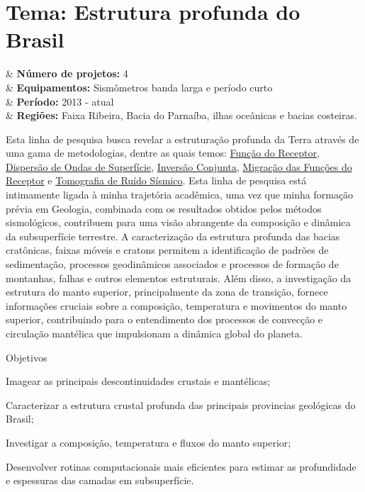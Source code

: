 \documentclass[10pt,a4paper,oneside]{book}
\begin{document}
\section{Tema: Estrutura profunda do Brasil}

\begin{summarybox}[frametitle=\faProjectDiagram{}\quad Panorama da linha de pesquisa]
	\begin{datelist}
		\faFile* & \textbf{Número de projetos:} 4 \\
		\faBinoculars & \textbf{Equipamentos:} Sismômetros banda larga e período curto \\
		\faCalendar*[regular] & \textbf{Período:} 2013 - atual \\
		\faMapMarked* & \textbf{Regiões:} Faixa Ribeira, Bacia do Parnaíba, ilhas oceânicas e bacias costeiras. \\
	\end{datelist}
\end{summarybox}

\bigskip

Esta linha de pesquisa busca revelar a estruturação profunda da Terra através de uma gama de metodologias, dentre as quais temos: \href{https://doi.org/10.1029/JB084iB09p04749}{Função do Receptor}, \href{https://doi.org/10.1111/j.1365-246X.1990.tb04573.x}{Dispersão de Ondas de Superfície}, \href{https://doi.org/10.1046/j.1365-246x.2000.00217.x}{Inversão Conjunta}, \href{https://doi.org/10.1016/j.epsl.2013.08.025}{Migração das Funções do Receptor} e \href{https://doi.org/10.1111/j.1365-246X.2007.03374.x}{Tomografia de Ruído Sísmico}. Esta linha de pesquisa está intimamente ligada à minha trajetória acadêmica, uma vez que minha formação prévia em Geologia, combinada com os resultados obtidos pelos métodos sismológicos, contribuem para uma visão abrangente da composição e dinâmica da subsuperfície terrestre. A caracterização da estrutura profunda das bacias cratônicas, faixas móveis e cratons permitem a identificação de padrões de sedimentação, processos geodinâmicos associados e processos de formação de montanhas, falhas e outros elementos estruturais. Além disso, a investigação da estrutura do manto superior, principalmente da zona de transição, fornece informações cruciais sobre a composição, temperatura e movimentos do manto superior, contribuindo para o entendimento dos processos de convecção e circulação mantélica que impulsionam a dinâmica global do planeta.  

\begin{fancyenum}{\faFutbol}{Objetivos}
	\item Imagear as principais descontinuidades crustais e mantélicas;
	\item Caracterizar a estrutura crustal profunda das principais provincias geológicas do Brasil;
	\item Investigar a composição, temperatura e fluxos do manto superior;
	\item Desenvolver rotinas computacionais mais eficientes para estimar as profundidade e espessuras das camadas em subsuperfície.
\end{fancyenum}
\end{document}
